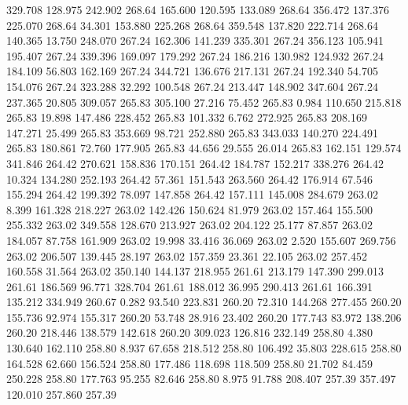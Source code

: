  329.708  128.975  242.902       268.64
 165.600  120.595  133.089       268.64
 356.472  137.376  225.070       268.64
  34.301  153.880  225.268       268.64
 359.548  137.820  222.714       268.64
 140.365   13.750  248.070       267.24
 162.306  141.239  335.301       267.24
 356.123  105.941  195.407       267.24
 339.396  169.097  179.292       267.24
 186.216  130.982  124.932       267.24
 184.109   56.803  162.169       267.24
 344.721  136.676  217.131       267.24
 192.340   54.705  154.076       267.24
 323.288   32.292  100.548       267.24
 213.447  148.902  347.604       267.24
 237.365   20.805  309.057       265.83
 305.100   27.216   75.452       265.83
   0.984  110.650  215.818       265.83
  19.898  147.486  228.452       265.83
 101.332    6.762  272.925       265.83
 208.169  147.271   25.499       265.83
 353.669   98.721  252.880       265.83
 343.033  140.270  224.491       265.83
 180.861   72.760  177.905       265.83
  44.656   29.555   26.014       265.83
 162.151  129.574  341.846       264.42
 270.621  158.836  170.151       264.42
 184.787  152.217  338.276       264.42
  10.324  134.280  252.193       264.42
  57.361  151.543  263.560       264.42
 176.914   67.546  155.294       264.42
 199.392   78.097  147.858       264.42
 157.111  145.008  284.679       263.02
   8.399  161.328  218.227       263.02
 142.426  150.624   81.979       263.02
 157.464  155.500  255.332       263.02
 349.558  128.670  213.927       263.02
 204.122   25.177   87.857       263.02
 184.057   87.758  161.909       263.02
  19.998   33.416   36.069       263.02
   2.520  155.607  269.756       263.02
 206.507  139.445   28.197       263.02
 157.359   23.361   22.105       263.02
 257.452  160.558   31.564       263.02
 350.140  144.137  218.955       261.61
 213.179  147.390  299.013       261.61
 186.569   96.771  328.704       261.61
 188.012   36.995  290.413       261.61
 166.391  135.212  334.949       260.67
   0.282   93.540  223.831       260.20
  72.310  144.268  277.455       260.20
 155.736   92.974  155.317       260.20
  53.748   28.916   23.402       260.20
 177.743   83.972  138.206       260.20
 218.446  138.579  142.618       260.20
 309.023  126.816  232.149       258.80
   4.380  130.640  162.110       258.80
   8.937   67.658  218.512       258.80
 106.492   35.803  228.615       258.80
 164.528   62.660  156.524       258.80
 177.486  118.698  118.509       258.80
  21.702   84.459  250.228       258.80
 177.763   95.255   82.646       258.80
   8.975   91.788  208.407       257.39
 357.497  120.010  257.860       257.39
